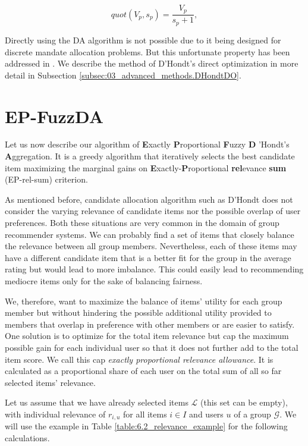 \begin{equation}
    quot(V_p, s_p) = \dfrac{V_p}{s_p + 1},
\end{equation}

Directly using the DA algorithm is not possible due to it being designed for discrete mandate allocation problems. But this unfortunate property has been addressed in \cite{fuzz_da}. We describe the method of D'Hondt's direct optimization in more detail in Subsection \ref{subsec:03_advanced_methods.DHondtDO}.

\section{EP-FuzzDA}

Let us now describe our algorithm of \textbf{E}xactly \textbf{P}roportional \textbf{F}uzzy \textbf{D} 'Hondt's \textbf{A}ggregation. It is a greedy algorithm that iteratively selects the best candidate item maximizing the marginal gains on \textbf{E}xactly-\textbf{P}roportional \textbf{rel}evance \textbf{sum} (EP-rel-sum) criterion.

As mentioned before, candidate allocation algorithm such as D'Hondt does not consider the varying relevance of candidate items nor the possible overlap of user preferences. Both these situations are very common in the domain of group recommender systems. We can probably find a set of items that closely balance the relevance between all group members. Nevertheless, each of these items may have a different candidate item that is a better fit for the group in the average rating but would lead to more imbalance. This could easily lead to recommending mediocre items only for the sake of balancing fairness.

We, therefore, want to maximize the balance of items' utility for each group member but without hindering the possible additional utility provided to members that overlap in preference with other members or are easier to satisfy. One solution is to optimize for the total item relevance but cap the maximum possible gain for each individual user so that it does not further add to the total item score. We call this cap \textit{exactly proportional relevance allowance}. It is calculated as a proportional share of each user on the total sum of all so far selected items' relevance.


Let us assume that we have already selected items $\mathcal{L}$ (this set can be empty), with individual relevance of $r_{i,u}$ for all items $i \in I$ and users $u$ of a group $\mathcal{G}$. We will use the example in Table \ref{table:6.2_relevance_example} for the following calculations.


